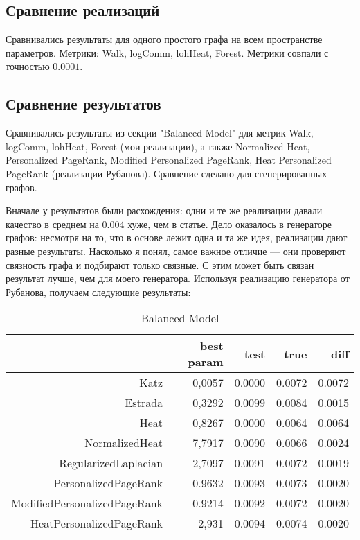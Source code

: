 \documentclass{article}
\begin{document}
\subsection{Сравнение реализаций}
Сравнивались результаты для одного простого графа на всем пространстве параметров. Метрики: Walk, logComm, lohHeat, Forest. Метрики совпали с точностью  $0.0001$.

\subsection{Сравнение результатов}
Сравнивались результаты из секции "Balanced Model" для метрик Walk, logComm, lohHeat, Forest (мои реализации), а также Normalized Heat, Personalized PageRank, Modified Personalized PageRank, Heat Personalized PageRank (реализации Рубанова). Сравнение сделано для сгенерированных графов.

Вначале у результатов были расхождения: одни и те же реализации давали качество в среднем на 0.004 хуже, чем в статье. Дело оказалось в генераторе графов: несмотря на то, что в основе лежит одна и та же идея, реализации дают разные результаты. Насколько я понял, самое важное отличие --- они проверяют связность графа и подбирают только связные. С этим может быть связан результат лучше, чем для моего генератора. Используя реализацию генератора от Рубанова, получаем следующие результаты:

\begin{table}[H]
\centering
\caption{Balanced Model}
\label{my-label}
\begin{tabular}{r|rrrr}
                             & best param & test   & true   & diff   \\
                             \hline
Katz                         & 0,0057     & 0.0000 & 0.0072 & \cellcolor{red!25} 0.0072 \\
Estrada                      & 0,3292     & 0.0099 & 0.0084 & \cellcolor{yellow!25} 0.0015 \\
Heat                         & 0,8267     & 0.0000 & 0.0064 & \cellcolor{red!25} 0.0064 \\
NormalizedHeat               & 7,7917     & 0.0090 & 0.0066 & \cellcolor{yellow!25} 0.0024 \\
RegularizedLaplacian         & 2,7097     & 0.0091 & 0.0072 & \cellcolor{yellow!25} 0.0019 \\
PersonalizedPageRank         & 0.9632     & 0.0093 & 0.0073 & \cellcolor{yellow!25} 0.0020 \\
ModifiedPersonalizedPageRank & 0.9214     & 0.0092 & 0.0072 & \cellcolor{yellow!25} 0.0020 \\
HeatPersonalizedPageRank     & 2,931      & 0.0094 & 0.0074 & \cellcolor{yellow!25} 0.0020
\end{tabular}
\end{table}
\end{document}
